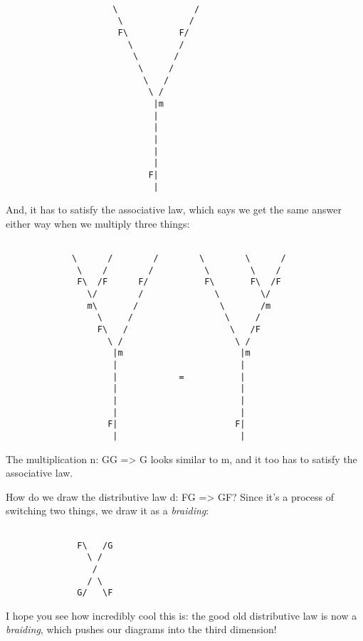 \begin{verbatim}

                     \               /
                      \             /
                      F\          F/
                        \         /
                         \       /
                          \     /
                           \   /
                            \ /
                             |m               
                             |
                             |
                             |
                             |
                             |
                            F|
                             |
\end{verbatim}
    
And, it has to satisfy the associative law, which says we
get the same answer either way when we multiply three things:


\begin{verbatim}

             \      /        /        \        \      /
              \    /        /          \        \    /
              F\  /F      F/           F\       F\  /F
                \/        /              \        \/
                m\       /                \       /m 
                  \     /                  \     /
                  F\   /                    \   /F
                    \ /                      \ /
                     |m                       |m
                     |                        |
                     |            =           |
                     |                        |
                     |                        |
                     |                        |
                    F|                       F|
                     |                        |
\end{verbatim}
    
The multiplication n: GG => G looks similar to m, and it too has
to satisfy the associative law.   

How do we draw the distributive law d: FG => GF?  Since it's a 
process of switching two things, we draw it as a \emph{braiding}:


\begin{verbatim}

              F\   /G
                \ /
                 / 
                / \
              G/   \F 
\end{verbatim}
    
I hope you see how incredibly cool this is: the good old 
distributive law is now a \emph{braiding}, which pushes our diagrams
into the third dimension!  

